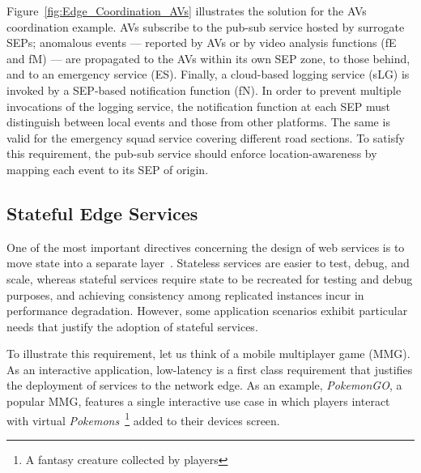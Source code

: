 Figure~\ref{fig:Edge_Coordination_AVs} illustrates the solution for the AVs coordination example. AVs subscribe to the pub-sub service hosted by surrogate SEPs; anomalous events --- reported by AVs or by video analysis functions (fE and fM) --- are propagated to the AVs within its own SEP zone, to those behind, and to an emergency service (ES). Finally, a cloud-based logging service (sLG) is invoked by a SEP-based notification function (fN). In order to prevent multiple invocations of the logging service, the notification function at each SEP must distinguish between local events and those from other platforms. The same is valid for the emergency squad service covering different road sections. To satisfy this requirement, the pub-sub service should enforce location-awareness by mapping each event to its SEP of origin.

\subsection{Stateful Edge Services}

One of the most important directives concerning the design of web services is to move state into a separate layer~\cite{Armbrust:2010}. Stateless services are easier to test, debug, and scale, whereas stateful services require state to be recreated for testing and debug purposes, and achieving consistency among replicated instances incur in performance degradation. However, some application scenarios exhibit particular needs that justify the adoption of stateful services.


To illustrate this requirement, let us think of a mobile multiplayer game (MMG). As an interactive application, low-latency is a first class requirement that justifies the deployment of services to the network edge. As an example, \textit{PokemonGO}, a popular MMG, features a single interactive use case in which players interact with virtual \textit{Pokemons}~\footnote{A fantasy creature collected by players} added to their devices screen. 
%

